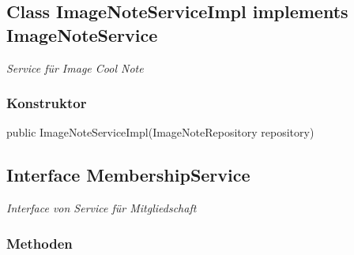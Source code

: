 \documentclass[a4paper]{scrreprt}
\begin{document}
    \subsection{Class ImageNoteServiceImpl implements ImageNoteService}
    \textit{Service für Image Cool Note}
    \subsubsection{Konstruktor}
    public ImageNoteServiceImpl(ImageNoteRepository repository)
    \subsection{Interface MembershipService}
    \textit{Interface von Service für Mitgliedschaft}
    \subsubsection{Methoden}
\end{document}
